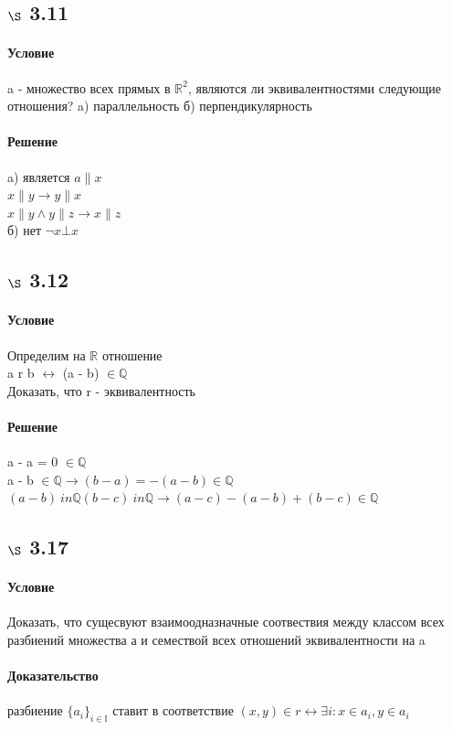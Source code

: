\documentclass[a4paper,12pt]{article}
\begin{document}
\subsection*{$\S$ 3.11}
\paragraph*{Условие}
a - множество всех прямых в $\mathbb{R}^2$, являются ли эквивалентностями следующие отношения?
a) параллельность
б) перпендикулярность
\paragraph*{Решение}
a) является $ a \parallel x $\\
$ x \parallel y \rightarrow y \parallel x$\\
$ x \parallel y \wedge  y \parallel z \rightarrow x \parallel z $\\
б) нет $ \neg x \bot x $ 

\subsection*{$\S$ 3.12}
\paragraph*{Условие}
Определим на $\mathbb{R}$ отношение\\
 a r b $\leftrightarrow$ (a - b) $ \in \mathbb{Q}$\\
Доказать, что r - эквивалентность
\paragraph*{Решение}
a - a = 0 $ \in \mathbb{Q}$\\
a - b $ \in \mathbb{Q} \rightarrow (b - a)=-(a - b) \in \mathbb{Q}$\\
$(a - b) \ in \mathbb{Q} (b - c) \ in \mathbb{Q} \rightarrow (a - c) - (a - b) + (b - c) \in \mathbb{Q}$ 

\subsection*{$\S$ 3.17}
\paragraph*{Условие}
Доказать, что сущесвуют взаимоодназначные соотвествия между классом всех разбиений множества а и семествой всех отношений эквивалентности на a
\paragraph*{Доказательство}
разбиение $\{a_i\}_{i\in\mathbb{I}}$ ставит в соответствие $(x, y) \in r \leftrightarrow \exists i: x \in a_i , y \in a_i$
\end{document}

